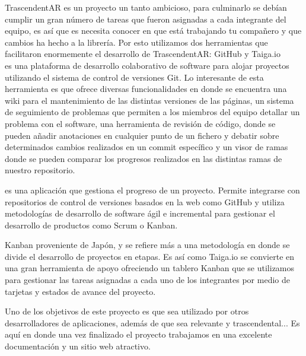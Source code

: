 \begin{multicols}{2}


TrascendentAR es un proyecto un tanto ambicioso, para culminarlo se debían cumplir un gran número de tareas que fueron asignadas a cada integrante del equipo, es así que es necesita conocer en que está trabajando tu compañero y que cambios ha hecho a la librería. Por esto utilizamos dos herramientas que facilitaron enormemente el desarrollo de TrascendentAR: GitHub y Taiga.io\\

 es una plataforma de desarrollo colaborativo de software para alojar proyectos utilizando el sistema de control de versiones Git. Lo interesante de esta herramienta es que ofrece diversas funcionalidades en donde se encuentra una wiki para el mantenimiento de las distintas versiones de las páginas, un sistema de seguimiento de problemas que permiten a los miembros del equipo detallar un problema con el software, una herramienta de revisión de código, donde se pueden añadir anotaciones en cualquier punto de un fichero y debatir sobre determinados cambios realizados en un commit específico y un visor de ramas donde se pueden comparar los progresos realizados en las distintas ramas de nuestro repositorio. \cite{github}



 es una aplicación que gestiona el progreso de un proyecto. Permite integrarse con repositorios de control de versiones basados en la web como GitHub y utiliza metodologías de desarrollo de software ágil e incremental para gestionar el desarrollo de productos como Scrum o Kanban. 

Kanban proveniente de Japón, y se refiere más a una metodología en donde se divide el desarrollo de proyectos en etapas. Es así como Taiga.io se convierte en una gran herramienta de apoyo ofreciendo un tablero Kanban que se utilizamos para gestionar las tareas asignadas a cada uno de los integrantes por medio de tarjetas y estados de avance del proyecto. 


Uno de los objetivos de este proyecto es que sea utilizado por otros desarrolladores de aplicaciones, además de que sea relevante y trascendental... Es aquí en donde una vez finalizado el proyecto trabajamos en una excelente documentación y un sitio web atractivo. 



\end{multicols}
